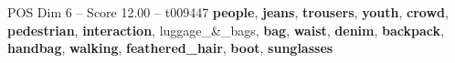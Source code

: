\begin{textsample}{POS Dim 6 – Score 12.00 – t009447}  \label{ex:f6_pos_035}
\textbf{people}, \textbf{jeans}, \textbf{trousers}, \textbf{youth}, \textbf{crowd}, \textbf{pedestrian}, \textbf{interaction}, luggage\_\&\_bags, \textbf{bag}, \textbf{waist}, \textbf{denim}, \textbf{backpack}, \textbf{handbag}, \textbf{walking}, \textbf{feathered\_hair}, \textbf{boot}, \textbf{sunglasses}

\end{textsample}
